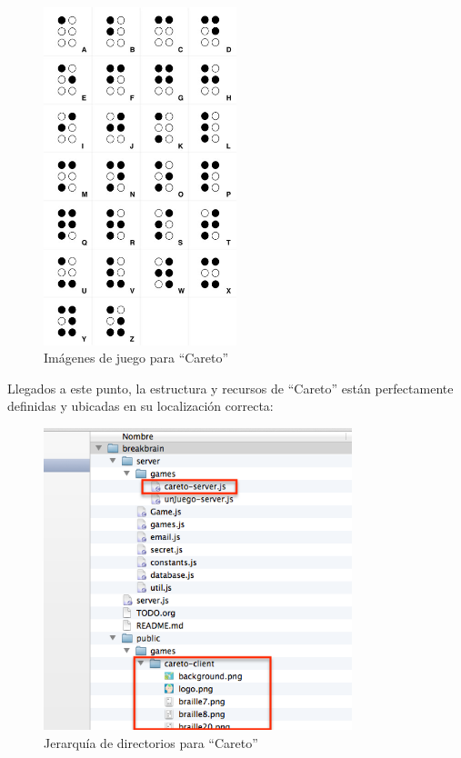 \begin{figure}[h]
  \begin{center}
    \includegraphics[width=0.5\textwidth]{images/braille.jpg}
    \caption{Imágenes de juego para ``Careto''}
    \label{fig::braille}
  \end{center}
\end{figure}

Llegados a este punto, la estructura y recursos de ``Careto'' están perfectamente definidas y ubicadas en su localización correcta:

\begin{figure}[H]
  \begin{center}
    \includegraphics[width=0.8\textwidth]{images/careto-jerarquia.png}
    \caption{Jerarquía de directorios para ``Careto''}
  \end{center}
\end{figure}

